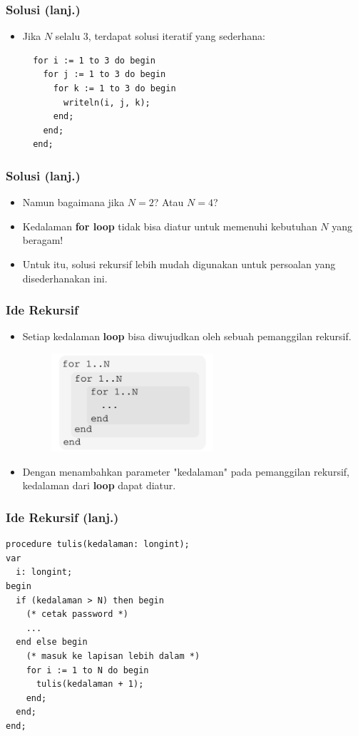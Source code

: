 \begin{frame}[fragile]
\frametitle{Solusi (lanj.)}
\begin{itemize}
  \item Jika $N$ selalu 3, terdapat solusi iteratif yang sederhana:
  
  \begin{lstlisting}
  for i := 1 to 3 do begin
    for j := 1 to 3 do begin
      for k := 1 to 3 do begin
        writeln(i, j, k);
      end;
    end; 
  end;
  \end{lstlisting}
\end{itemize}
\end{frame}

\begin{frame}[fragile]
\frametitle{Solusi (lanj.)}
\begin{itemize}
  \item Namun bagaimana jika $N=2$? Atau $N=4$?
  \item Kedalaman \textbf{for loop} tidak bisa diatur untuk memenuhi kebutuhan $N$ yang beragam!
  \item Untuk itu, solusi rekursif lebih mudah digunakan untuk persoalan yang disederhanakan ini.
\end{itemize}
\end{frame}

\begin{frame}[fragile]
\frametitle{Ide Rekursif}
\begin{itemize}
  \item Setiap kedalaman \textbf{loop} bisa diwujudkan oleh sebuah pemanggilan rekursif.
  
  \begin{figure}
    \centering 
    \includegraphics[width=6cm]{asset/lapis.pdf}
  \end{figure}
  
  \item Dengan menambahkan parameter "kedalaman" pada pemanggilan rekursif, kedalaman dari \textbf{loop} dapat diatur.
\end{itemize}
\end{frame}

\begin{frame}[fragile]
\frametitle{Ide Rekursif (lanj.)}
\begin{lstlisting}
procedure tulis(kedalaman: longint);
var
  i: longint;
begin
  if (kedalaman > N) then begin
    (* cetak password *)
    ...
  end else begin
    (* masuk ke lapisan lebih dalam *)
    for i := 1 to N do begin
      tulis(kedalaman + 1);
    end;
  end;
end;
\end{lstlisting}
\end{frame}

